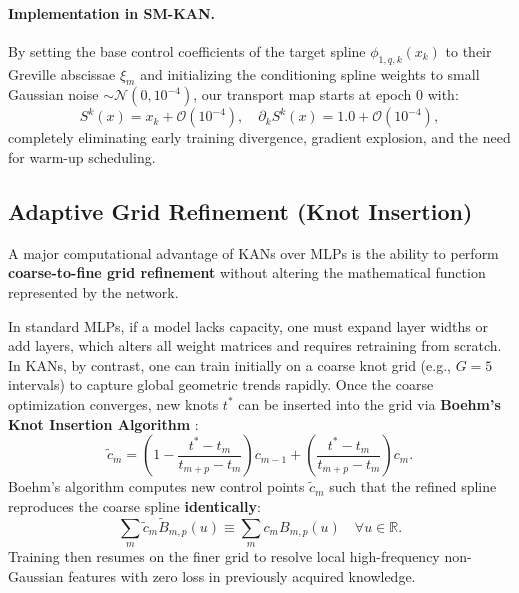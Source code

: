 \documentclass[11pt,a4paper]{article}
\theoremstyle{plain}
\theoremstyle{definition}
\theoremstyle{remark}
\begin{document}
\paragraph{Implementation in SM-KAN.}
By setting the base control coefficients of the target spline $\phi_{1, q, k}(x_k)$ to their Greville abscissae $\xi_m$ and initializing the conditioning spline weights to small Gaussian noise $\sim \mathcal{N}(0, 10^{-4})$, our transport map starts at epoch 0 with:
\begin{equation}
    S^k(x) = x_k + \mathcal{O}(10^{-4}), \quad \partial_k S^k(x) = 1.0 + \mathcal{O}(10^{-4}),
\end{equation}
completely eliminating early training divergence, gradient explosion, and the need for warm-up scheduling.

\subsection{Adaptive Grid Refinement (Knot Insertion)}

A major computational advantage of KANs over MLPs is the ability to perform \textbf{coarse-to-fine grid refinement} without altering the mathematical function represented by the network.

In standard MLPs, if a model lacks capacity, one must expand layer widths or add layers, which alters all weight matrices and requires retraining from scratch. In KANs, by contrast, one can train initially on a coarse knot grid (e.g., $G = 5$ intervals) to capture global geometric trends rapidly. Once the coarse optimization converges, new knots $t^*$ can be inserted into the grid via \textbf{Boehm's Knot Insertion Algorithm} \cite{boehm1980inserting}:
\begin{equation}
    \tilde{c}_m = \left( 1 - \frac{t^* - t_m}{t_{m+p} - t_m} \right) c_{m-1} + \left( \frac{t^* - t_m}{t_{m+p} - t_m} \right) c_m.
\end{equation}
Boehm's algorithm computes new control points $\tilde{c}_m$ such that the refined spline reproduces the coarse spline \textbf{identically}:
\begin{equation}
    \sum_{m} \tilde{c}_m \tilde{B}_{m, p}(u) \equiv \sum_{m} c_m B_{m, p}(u) \quad \forall u \in \mathbb{R}.
\end{equation}
Training then resumes on the finer grid to resolve local high-frequency non-Gaussian features with zero loss in previously acquired knowledge.
\end{document}
